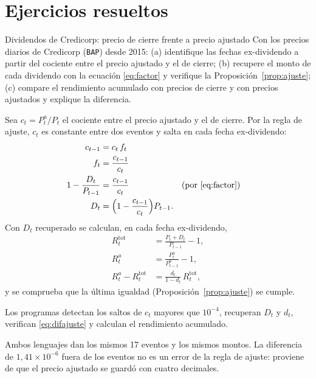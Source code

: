 \section{Ejercicios resueltos}

\begin{ejresuelto}{Dividendos de Credicorp: precio de cierre frente a precio ajustado}\label{ej:dividendos}
\enunciado Con los precios diarios de Credicorp (\texttt{BAP}) desde 2015: (a) identifique las fechas
ex-dividendo a partir del cociente entre el precio ajustado y el de cierre; (b) recupere el monto de cada
dividendo con la ecuación \eqref{eq:factor} y verifique la Proposición~\ref{prop:ajuste}; (c) compare el
rendimiento acumulado con precios de cierre y con precios ajustados y explique la diferencia.

\solucion
{} Sea $c_t=P^a_t/P_t$ el cociente entre el precio ajustado y el de cierre. Por la regla
de ajuste, $c_t$ es constante entre dos eventos y salta en cada fecha ex-dividendo:
\begin{align*}
  c_{t-1} &= c_t\,f_t\\
  f_t     &= \frac{c_{t-1}}{c_t}\\
  1-\frac{D_t}{P_{t-1}} &= \frac{c_{t-1}}{c_t} && \text{(por \eqref{eq:factor})}\\
  D_t     &= \Bigl(1-\frac{c_{t-1}}{c_t}\Bigr)P_{t-1}.
\end{align*}
 Con $D_t$ recuperado se calculan, en cada fecha ex-dividendo,
\begin{align*}
  R^{\mathrm{tot}}_t       &= \frac{P_t+D_t}{P_{t-1}}-1,\\
  R^{a}_t                  &= \frac{P^{a}_t}{P^{a}_{t-1}}-1,\\
  R^{a}_t-R^{\mathrm{tot}}_t &= \frac{d_t}{1-d_t}\,R^{\mathrm{tot}}_t,
\end{align*}
y se comprueba que la última igualdad (Proposición~\ref{prop:ajuste}) se cumple.

 Los programas detectan los saltos de $c_t$ mayores que $10^{-4}$, recuperan
$D_t$ y $d_t$, verifican \eqref{eq:difajuste} y calculan el rendimiento acumulado.


\RvsPy Ambos lenguajes dan los mismos 17 eventos y los mismos montos. La diferencia de $1{,}41\times
10^{-6}$ fuera de los eventos no es un error de la regla de ajuste: proviene de que el precio ajustado
se guardó con cuatro decimales.


\end{ejresuelto}
